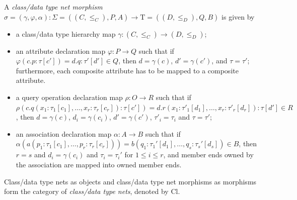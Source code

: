 \documentclass[10pt, a4paper]{isov2}
\newcommand{\Tau}{\mathrm{T}}
\begin{document}
A \emph{class/data type net morphism}
$\sigma = (\gamma, \varphi, \alpha) : \Sigma = ((C,
{\leq}_C), P, A) \to \Tau = ((D, {\leq}_D),\allowbreak
Q,\allowbreak B)$ is given by
%
\begin{itemize}[label={--}, leftmargin=*]
  \item a class/data type hierarchy map $\gamma : (C, {\leq_C}) \to (D,
{\leq_D})$;

  \item an attribute declaration map $\varphi : P \to Q$ such that if
$\varphi({c.p : \tau[c']}) = {d.q : \tau'[d']} \in Q$, then
$d = \gamma(c)$, $d' = \gamma(c')$, and $\tau = \tau'$; furthermore,
each composite attribute has to be mapped to a composite attribute.

  \item a query operation declaration map $\rho : O \to R$ such that if
$\rho(c.q(x_1 : \tau_1[c_1], \dots, x_r : \tau_r[c_r]) : \tau[c']) =
d.r(x_1 : \tau'_1[d_1], \dots, x_r : \tau'_r[d_r]) : \tau[d'] \in R$, 
then $d = \gamma(c)$, $d_i = \gamma(c_i)$, 
$d' = \gamma(c')$, $\tau'_i = \tau_i$ and $\tau = \tau'$;

  \item an association declaration map $\alpha : A \to B$ such that if
$\alpha(a(p_1 : \tau_1[c_1], \dots, p_r : \tau_r[c_r])) = b(q_1 :
\tau_1'[d_1], \dots, q_s : \tau_s'[d_s]) \in B$,
then $r = s$ and $d_i = \gamma(c_i)$ and $\tau_i = \tau_i'$ for
$1 \leq i \leq r$, and member ends owned by the association are mapped
into owned member ends.
\end{itemize}

Class/data type nets as objects and class/data type net morphisms as
morphisms form the category of \emph{class/data type nets}, denoted by
$\mathrm{Cl}$.
\end{document}
